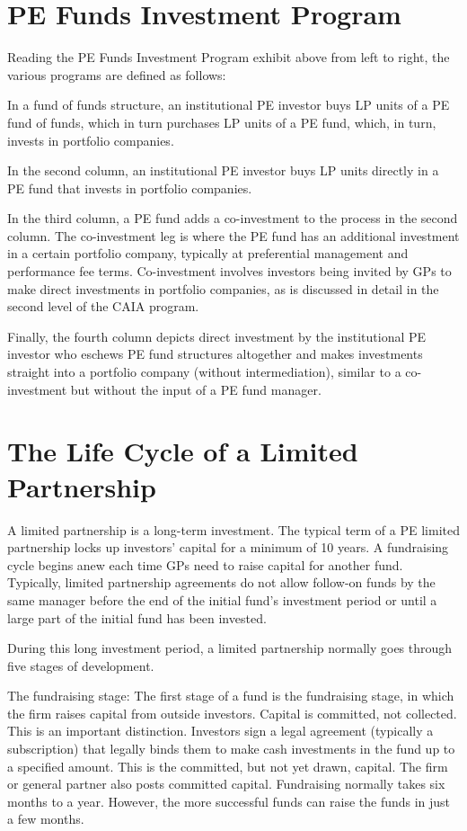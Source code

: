 \documentclass[11pt]{article}
\begin{document}
\section*{PE Funds Investment Program}
Reading the PE Funds Investment Program exhibit above from left to right, the various programs are defined as follows:

In a fund of funds structure, an institutional PE investor buys LP units of a PE fund of funds, which in turn purchases LP units of a PE fund, which, in turn, invests in portfolio companies.

In the second column, an institutional PE investor buys LP units directly in a PE fund that invests in portfolio companies.

In the third column, a PE fund adds a co-investment to the process in the second column. The co-investment leg is where the PE fund has an additional investment in a certain portfolio company, typically at preferential management and performance fee terms. Co-investment involves investors being invited by GPs to make direct investments in portfolio companies, as is discussed in detail in the second level of the CAIA program.

Finally, the fourth column depicts direct investment by the institutional PE investor who eschews PE fund structures altogether and makes investments straight into a portfolio company (without intermediation), similar to a co-investment but without the input of a PE fund manager.

\section*{The Life Cycle of a Limited Partnership}
A limited partnership is a long-term investment. The typical term of a PE limited partnership locks up investors' capital for a minimum of 10 years. A fundraising cycle begins anew each time GPs need to raise capital for another fund. Typically, limited partnership agreements do not allow follow-on funds by the same manager before the end of the initial fund's investment period or until a large part of the initial fund has been invested.

During this long investment period, a limited partnership normally goes through five stages of development.

The fundraising stage: The first stage of a fund is the fundraising stage, in which the firm raises capital from outside investors. Capital is committed, not collected. This is an important distinction. Investors sign a legal agreement (typically a subscription) that legally binds them to make cash investments in the fund up to a specified amount. This is the committed, but not yet drawn, capital. The firm or general partner also posts committed capital. Fundraising normally takes six months to a year. However, the more successful funds can raise the funds in just a few months.
\end{document}
